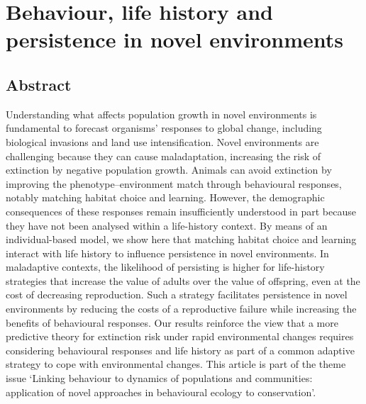 \chapter[Behaviour and life history in novel environments]{Behaviour, life
history and persistence in novel environments}\label{ch:LH-Behaviour model}


\section*{Abstract}
Understanding what affects population growth in novel environments is
fundamental to forecast organisms’ responses to global change, including
biological invasions and land use intensification. Novel environments are
challenging because they can cause maladaptation, increasing the risk of
extinction by negative population growth. Animals can avoid extinction by
improving the phenotype–environment match through behavioural
responses, notably matching habitat choice and learning. However, the 
demographic consequences of these responses remain insufficiently understood in
part because they have not been analysed within a life-history context. By
means of an individual-based model, we show here that matching habitat
choice and learning interact with life history to influence persistence in
novel environments. In maladaptive contexts, the likelihood of persisting is
higher for life-history strategies that increase the value of adults over the
value of offspring, even at the cost of decreasing reproduction. Such a strategy
facilitates persistence in novel environments by reducing the costs of a 
reproductive failure while increasing the benefits of behavioural responses. Our
results reinforce the view that a more predictive theory for extinction risk
under rapid environmental changes requires considering behavioural
responses and life history as part of a common adaptive strategy to cope
with environmental changes.
This article is part of the theme issue ‘Linking behaviour to dynamics of
populations and communities: application of novel approaches in behavioural
ecology to conservation’.



